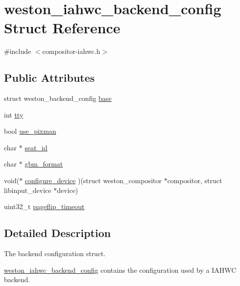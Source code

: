 \hypertarget{structweston__iahwc__backend__config}{}\section{weston\+\_\+iahwc\+\_\+backend\+\_\+config Struct Reference}
\label{structweston__iahwc__backend__config}


{\ttfamily \#include $<$compositor-\/iahwc.\+h$>$}

\subsection*{Public Attributes}
\begin{DoxyCompactItemize}
\item 
struct weston\+\_\+backend\+\_\+config \mbox{\hyperlink{structweston__iahwc__backend__config_a8b826a5287e002811707353940abebd0}{base}}
\item 
int \mbox{\hyperlink{structweston__iahwc__backend__config_a61199ee6b7a616cb0fe28b66b7c0d720}{tty}}
\item 
bool \mbox{\hyperlink{structweston__iahwc__backend__config_af939b243b744604cb451f831a29c5357}{use\+\_\+pixman}}
\item 
char $\ast$ \mbox{\hyperlink{structweston__iahwc__backend__config_aebd15a83584df1a374b36c7acccaa711}{seat\+\_\+id}}
\item 
char $\ast$ \mbox{\hyperlink{structweston__iahwc__backend__config_a7724433a34f97ba19aed8cf44e439257}{gbm\+\_\+format}}
\item 
void($\ast$ \mbox{\hyperlink{structweston__iahwc__backend__config_af60c36d07f2eae72f1164e2497a072f2}{configure\+\_\+device}} )(struct weston\+\_\+compositor $\ast$compositor, struct libinput\+\_\+device $\ast$device)
\item 
uint32\+\_\+t \mbox{\hyperlink{structweston__iahwc__backend__config_af4155ad1f54bc45582a1783d62c53fb9}{pageflip\+\_\+timeout}}
\end{DoxyCompactItemize}


\subsection{Detailed Description}
The backend configuration struct.

\mbox{\hyperlink{structweston__iahwc__backend__config}{weston\+\_\+iahwc\+\_\+backend\+\_\+config}} contains the configuration used by a I\+A\+H\+WC backend. 

